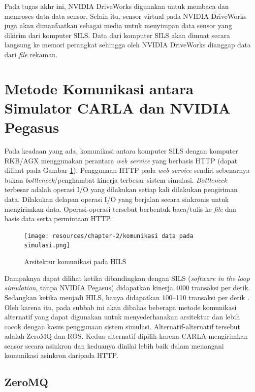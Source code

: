 Pada tugas akhr ini, NVIDIA DriveWorks digunakan untuk membaca dan
memroses data-data sensor. Selain itu, sensor virtual pada NVIDIA DriveWorks
juga akan dimanfaatkan sebagai media untuk menyimpan data sensor yang dikirim
dari komputer SILS. Data dari komputer SILS akan dimuat secara langsung ke
memori perangkat sehingga oleh NVIDIA DriveWorks dianggap data dari
\textit{file} rekaman.

\section{Metode Komunikasi antara Simulator CARLA dan NVI\-DI\-A Pegasus}

Pada keadaan yang ada, komunikasi antara komputer SILS dengan komputer RKB/AGX
menggunakan perantara \textit{web service} yang berbasis HTTP (dapat dilihat
pada Gambar \ref{chapter-2-old-hils}). Penggunaan HTTP pada \textit{web service}
sendiri sebenarnya bukan \textit{bottleneck}/penghambat kinerja terbesar sistem
simulasi. \textit{Bottleneck} terbesar adalah operasi I/O yang dilakukan setiap
kali dilakukan pengiriman data. Dilakukan delapan operasi I/O yang berjalan
secara sinkronis untuk mengirimkan data. Operasi-operasi tersebut berbentuk
baca/tulis ke \textit{file} dan basis data serta permintaan HTTP.

\begin{figure}[h!]
    \centering
    \texttt{[image: resources/chapter-2/komunikasi
        data pada simulasi.png]}
    \caption{Arsitektur komunikasi pada HILS \parencite{trilaksono_laporanRispro}}
    \label{chapter-2-old-hils}
\end{figure}

Dampaknya dapat dilihat ketika dibandingkan dengan SILS (\textit{software
    in the loop simulation}, tanpa NVIDIA Pegasus) didapatkan kinerja 4000 transaksi
per detik. Sedangkan ketika menjadi HILS, hanya didapatkan 100--110 transaksi per
detik \parencite{trilaksono_laporanRispro}. Oleh karena itu, pada subbab ini
akan dibahas beberapa metode komunikasi alternatif yang dapat digunakan untuk
menyederhanakan arsitektur dan lebih cocok dengan kasus penggunaan sistem
simulasi. Alternatif-alternatif tersebut adalah ZeroMQ dan ROS. Kedua alternatif
dipilih karena CARLA mengirimkan sensor secara asinkron dan keduanya dinilai
lebih baik dalam menangani komunikasi asinkron daripada HTTP.

\subsection{ZeroMQ}


